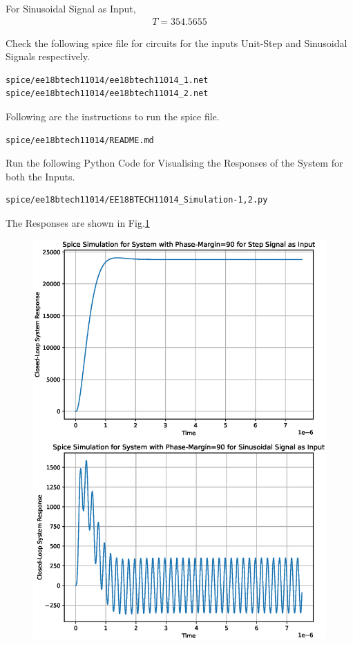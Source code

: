 \begin{enumerate}[label=\thesection.\arabic*.,ref=\thesection.\theenumi]
For Sinusoidal Signal as Input,
\begin{align}
T = 354.5655
\end{align}

Check the following spice file for circuits for the inputs Unit-Step and Sinusoidal Signals respectively.
\begin{lstlisting}
spice/ee18btech11014/ee18btech11014_1.net
spice/ee18btech11014/ee18btech11014_2.net
\end{lstlisting}

Following are the instructions to run the spice file.
\begin{lstlisting}
spice/ee18btech11014/README.md
\end{lstlisting}

Run the following Python Code for Visualising the Responses of the System for both the Inputs.
\begin{lstlisting}
spice/ee18btech11014/EE18BTECH11014_Simulation-1,2.py
\end{lstlisting}

The Responses are shown in Fig.\ref{fig:PM=90}
\begin{figure}[ht!]
	\begin{center}
		\includegraphics[width=\columnwidth]{./figs/ee18btech11014/ee18btech11014_Spice_Result_PM=90.eps}
	\end{center}
	\caption{}
	\label{fig:PM=90}
\end{figure}



\end{enumerate}
